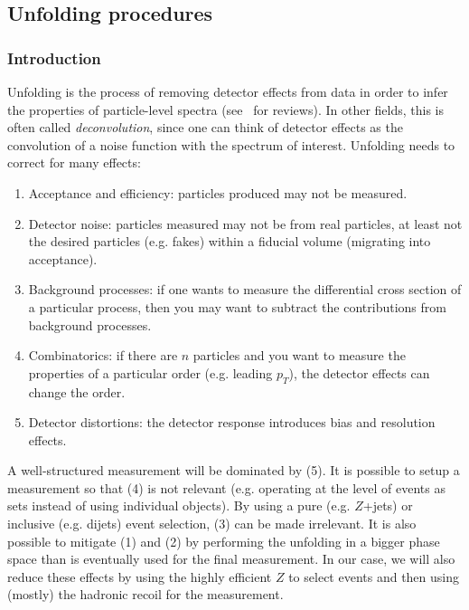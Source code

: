 \subsection{Unfolding procedures}

\subsubsection{Introduction}

Unfolding is the process of removing detector effects from data in order to infer the properties of particle-level spectra (see~\cite{Cowan:2002in,Blobel:2203257,doi:10.1002/9783527653416.ch6,Balasubramanian:2019itp} for reviews).  In other fields, this is often called \textit{deconvolution}, since one can think of detector effects as the convolution of a noise function with the spectrum of interest.  Unfolding needs to correct for many effects:

\begin{enumerate}[label={(\arabic*)}]
\item Acceptance and efficiency: particles produced may not be measured.
\item Detector noise: particles measured may not be from real particles, at least not the desired particles (e.g. fakes) within a fiducial volume (migrating into acceptance).
\item Background processes: if one wants to measure the differential cross section of a particular process, then you may want to subtract the contributions from background processes.
\item Combinatorics: if there are $n$ particles and you want to measure the properties of a particular order (e.g. leading $p_T$), the detector effects can change the order.
\item Detector distortions: the detector response introduces bias and resolution effects.
\end{enumerate}

A well-structured measurement will be dominated by (5).  It is possible to setup a measurement so that (4) is not relevant (e.g. operating at the level of events as sets instead of using individual objects).  By using a pure (e.g. $Z$+jets) or inclusive (e.g. dijets) event selection, (3) can be made irrelevant.  It is also possible to mitigate (1) and (2) by performing the unfolding in a bigger phase space than is eventually used for the final measurement.  In our case, we will also reduce these effects by using the highly efficient $Z$ to select events and then using (mostly) the hadronic recoil for the measurement.

